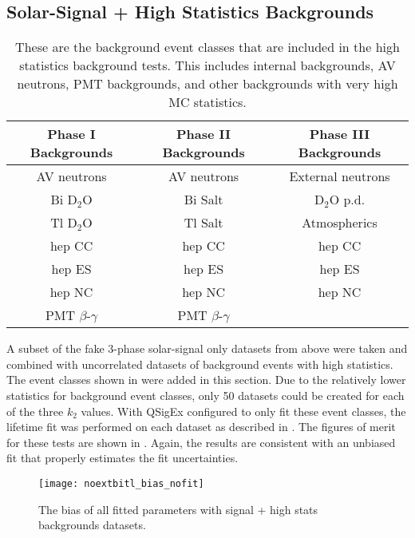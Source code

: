 \clearpage

\subsection{Solar-Signal + High Statistics Backgrounds}

\begin{table}
\centering
\begin{tabular}{ccc}
\hline
Phase I Backgrounds & Phase II Backgrounds & Phase III Backgrounds \\ \hline \hline
AV neutrons & AV neutrons & External neutrons \\
Bi D$_2$O & Bi Salt & D$_2$O p.d. \\ 
Tl D$_2$O & Tl Salt & Atmospherics \\
hep CC & hep CC & hep CC \\
hep ES & hep ES & hep ES \\
hep NC & hep NC & hep NC \\
PMT $\beta$-$\gamma$ & PMT $\beta$-$\gamma$ \\ \hline
\end{tabular}
\caption{
These are the background event classes that are included in the high statistics background tests. This includes internal backgrounds, AV neutrons, PMT backgrounds, and other backgrounds with very high MC statistics.
}
\label{tbl:noextbitl_event_classes}
\end{table}

A subset of the fake 3-phase solar-signal only datasets from above were taken and combined with uncorrelated datasets of background events with high statistics.
The event classes shown in  were added in this section. 
Due to the relatively lower statistics for background event classes, only 50 datasets could be created for each of the three $k_2$ values.
With QSigEx configured to only fit these event classes, the lifetime fit was performed on each dataset as described in . 
The figures of merit for these tests are shown in . 
Again, the results are consistent with an unbiased fit that properly estimates the fit uncertainties.

\begin{figure}
\centering
\texttt{[image: noextbitl\_bias\_nofit]}
\caption{
The bias of all fitted parameters with signal + high stats backgrounds datasets.
}
\label{fig:noextbitl_bias}
\end{figure}

